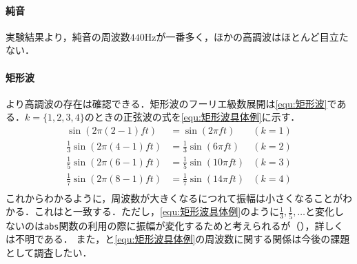 \paragraph{純音}実験結果より，純音の周波数\(440\textrm{Hz}\)が一番多く，ほかの高調波はほとんど目立たない．
\paragraph{矩形波}より高調波の存在は確認できる．矩形波のフーリエ級数展開は\eqref{equ:矩形波}である．\(k=\{1,2,3,4\}\)のときの正弦波の式を\eqref{equ:矩形波具体例}に示す．
\begin{equation}
    \begin{aligned}
        \sin(2\pi(2-1)ft)            & =\sin(2\pi ft)             & (k=1) \\
        \frac{1}{3}\sin(2\pi(4-1)ft) & =\frac{1}{3}\sin(6\pi ft)  & (k=2) \\
        \frac{1}{5}\sin(2\pi(6-1)ft) & =\frac{1}{5}\sin(10\pi ft) & (k=3) \\
        \frac{1}{7}\sin(2\pi(8-1)ft) & =\frac{1}{7}\sin(14\pi ft) & (k=4) \\
    \end{aligned}\label{equ:矩形波具体例}
\end{equation}
これからわかるように，周波数が大きくなるにつれて振幅は小さくなることがわかる．これはと一致する．ただし，\eqref{equ:矩形波具体例}のように\(\frac{1}{3}, \frac{1}{5},\dots\)と変化しないのは\texttt{abs}関数の利用の際に振幅が変化するためと考えられるが（），詳しくは不明である．
また，と\eqref{equ:矩形波具体例}の周波数に関する関係は今後の課題として調査したい．
